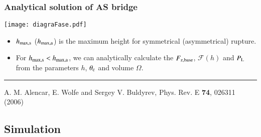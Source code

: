 \documentclass[8pt]{beamer}
\begin{document}
\begin{frame}
\frametitle{Analytical solution of AS bridge}
   		\begin{center}
       			\texttt{[image: diagraFase.pdf]}\\   		
   		\end{center}   		
   			\begin{itemize}
   				\item $h_{\rm max, s}$ ($h_{\rm max, a}$) is the maximum height for symmetrical (asymmetrical) rupture.
   				\item For $h_{\rm max, s} < h_{\rm max, a}$, we can analytically calculate the $F_{\rm{z,base}}$, $\mathcal F(h)$ and $P_{\rm L}$ from the parameters $h$, $\theta_{\rm c}$ and volume $\Omega$. 
   			\end{itemize}   				
		\rule{\textwidth}{0.5pt}
        A. M. Alencar, E. Wolfe and Sergey V. Buldyrev, Phys. Rev. E \textbf{74}, 026311 (2006)\\   			
\end{frame}		

\subsection{Simulation}
\end{document}
